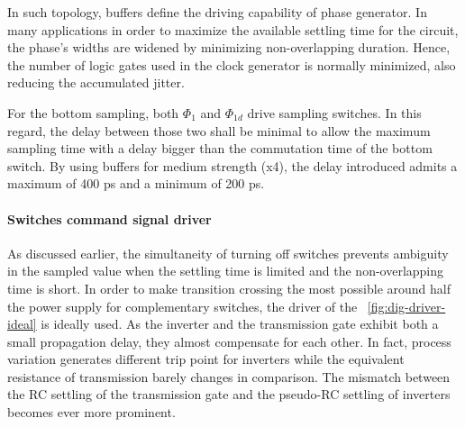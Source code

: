In such topology, buffers define the driving capability of phase generator. In many applications in order to maximize the available settling time for the circuit, the phase's widths are widened by minimizing non-overlapping duration. Hence, the number of logic gates used in the clock generator is normally minimized, also reducing the accumulated jitter.

For the bottom sampling, both \(\Phi_1\) and \(\Phi_{1d}\) drive sampling switches. In this regard, the delay between those two shall be minimal to allow the maximum sampling time with a delay bigger than the commutation time of the bottom switch. By using buffers for medium strength (x4), the delay introduced admits a maximum of 400 ps and a minimum of 200 ps.
\paragraph{Switches command signal driver}
\label{sec:dig-driver}

As discussed earlier, the simultaneity of turning off switches prevents ambiguity in the sampled value when the settling time is limited and the non-overlapping time is short. In order to make transition crossing the most possible around half the power supply for complementary switches, the driver of the \figurename~\ref{fig:dig-driver-ideal} is ideally used. As the inverter and the transmission gate exhibit both a small propagation delay, they almost compensate for each other. In fact, process variation generates different trip point for inverters while the equivalent resistance of transmission barely changes in comparison. The mismatch between the RC settling of the transmission gate and the pseudo-RC settling of inverters becomes ever more prominent.

